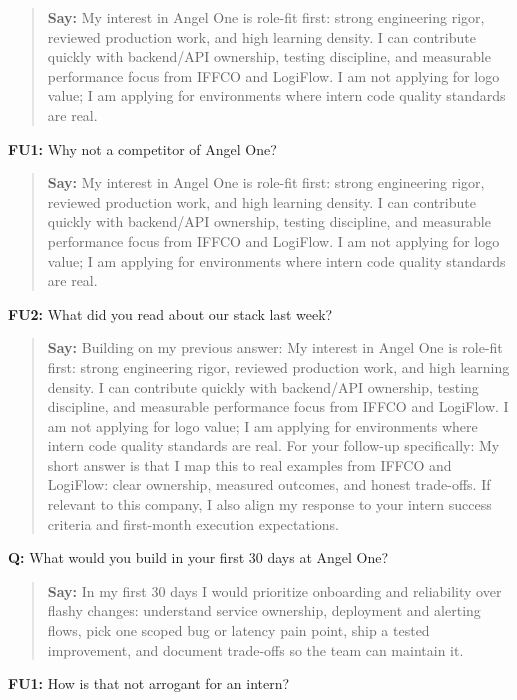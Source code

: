 \documentclass[9pt,a4paper]{article}
\begin{document}
\begin{quote}\small\textbf{Say:} My interest in Angel One is role-fit first: strong engineering rigor, reviewed production work, and high learning density. I can contribute quickly with backend/API ownership, testing discipline, and measurable performance focus from IFFCO and LogiFlow. I am not applying for logo value; I am applying for environments where intern code quality standards are real.\end{quote}
\vspace{2mm}
\textbf{FU1:} Why not a competitor of Angel One?

\begin{quote}\small\textbf{Say:} My interest in Angel One is role-fit first: strong engineering rigor, reviewed production work, and high learning density. I can contribute quickly with backend/API ownership, testing discipline, and measurable performance focus from IFFCO and LogiFlow. I am not applying for logo value; I am applying for environments where intern code quality standards are real.\end{quote}
\vspace{2mm}
\textbf{FU2:} What did you read about our stack last week?

\begin{quote}\small\textbf{Say:} Building on my previous answer: My interest in Angel One is role-fit first: strong engineering rigor, reviewed production work, and high learning density. I can contribute quickly with backend/API ownership, testing discipline, and measurable performance focus from IFFCO and LogiFlow. I am not applying for logo value; I am applying for environments where intern code quality standards are real. For your follow-up specifically: My short answer is that I map this to real examples from IFFCO and LogiFlow: clear ownership, measured outcomes, and honest trade-offs. If relevant to this company, I also align my response to your intern success criteria and first-month execution expectations.\end{quote}
\vspace{2mm}
\textbf{Q:} What would you build in your first 30 days at Angel One?

\begin{quote}\small\textbf{Say:} In my first 30 days I would prioritize onboarding and reliability over flashy changes: understand service ownership, deployment and alerting flows, pick one scoped bug or latency pain point, ship a tested improvement, and document trade-offs so the team can maintain it.\end{quote}
\vspace{2mm}
\textbf{FU1:} How is that not arrogant for an intern?
\end{document}
